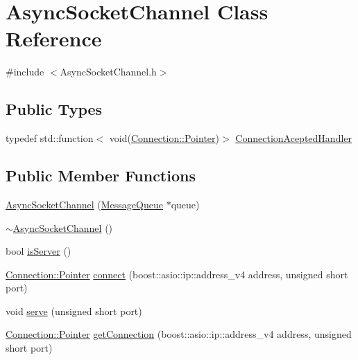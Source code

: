 \hypertarget{class_async_socket_channel}{}\section{Async\+Socket\+Channel Class Reference}
\label{class_async_socket_channel}


{\ttfamily \#include $<$Async\+Socket\+Channel.\+h$>$}

\subsection*{Public Types}
\begin{DoxyCompactItemize}
\item 
typedef std\+::function$<$ void(\hyperlink{class_connection_afc73789251390ec9c9c6e3750b104f08}{Connection\+::\+Pointer})$>$ \hyperlink{class_async_socket_channel_a9fae896907c968c9ea2ec825cd130b31}{Connection\+Acepted\+Handler}
\end{DoxyCompactItemize}
\subsection*{Public Member Functions}
\begin{DoxyCompactItemize}
\item 
\hyperlink{class_async_socket_channel_a98d850ca495d47b38d7d981ee7ee243b}{Async\+Socket\+Channel} (\hyperlink{class_message_queue}{Message\+Queue} $\ast$queue)
\item 
\hyperlink{class_async_socket_channel_aee710afec500bd16eb47f2c423baeb56}{$\sim$\+Async\+Socket\+Channel} ()
\item 
bool \hyperlink{class_async_socket_channel_ab2839fe16b7dffa0502ca69dc7e66299}{is\+Server} ()
\item 
\hyperlink{class_connection_afc73789251390ec9c9c6e3750b104f08}{Connection\+::\+Pointer} \hyperlink{class_async_socket_channel_a7b32d91f71dbea006cd1f7e631abb5c8}{connect} (boost\+::asio\+::ip\+::address\+\_\+v4 address, unsigned short port)
\item 
void \hyperlink{class_async_socket_channel_ae0d0010ef42fecc249ae1542b226130c}{serve} (unsigned short port)
\item 
\hyperlink{class_connection_afc73789251390ec9c9c6e3750b104f08}{Connection\+::\+Pointer} \hyperlink{class_async_socket_channel_a16520ee5501d92d322a21f3f245855d2}{get\+Connection} (boost\+::asio\+::ip\+::address\+\_\+v4 address, unsigned short port)
\end{DoxyCompactItemize}
